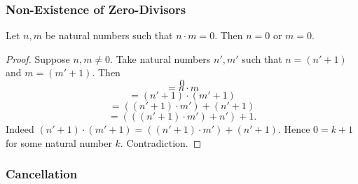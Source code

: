 \documentclass[10pt]{article}
\begin{document}
  \subsubsection*{Non-Existence of Zero-Divisors}

  \begin{forthel}
    \begin{proposition}
      Let $n, m$ be natural numbers such that $n \cdot m = 0$.
      Then $n = 0$ or $m = 0$.
    \end{proposition}
    \begin{proof}
      Suppose $n, m \neq 0$.
      Take natural numbers $n', m'$ such that $n = (n' + 1)$ and $m = (m' + 1)$.
      Then
      \[  0                                     \]
      \[    = n \cdot m                         \]
      \[    = (n' + 1) \cdot (m' + 1)           \]
      \[    = ((n' + 1) \cdot m') + (n' + 1)    \]
      \[    = (((n' + 1) \cdot m') + n') + 1.   \]
      Indeed $(n' + 1) \cdot (m' + 1) = ((n' + 1) \cdot m') + (n' + 1)$.
      Hence $0 = k + 1$ for some natural number $k$.
      Contradiction.
    \end{proof}
  \end{forthel}


  \subsubsection*{Cancellation}
\end{document}
